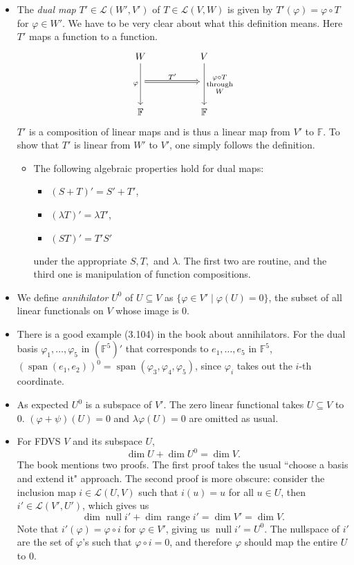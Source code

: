 \documentclass{article}
\newcommand{\F}{\mathbb{F}}
\newcommand{\s}{\operatorname{span}}
\newcommand{\n}{\operatorname{null}}
\renewcommand{\r}{\operatorname{range}}
\renewcommand{\d}{\dim}
\newcommand{\LVW}{\mathcal{L}(V,W)}
\renewcommand{\phi}{\varphi}
\begin{document}
\begin{itemize}
\begin{itemize}
    \end{itemize}
    \item The \textit{dual map} $T' \in \mathcal{L}(W',V')$ of $T \in \LVW$ is given by $T'(\phi)=\phi \circ T$ for $\phi \in W'$. We have to be very clear about what this definition means. Here $T'$ maps a function to a function.
    \begin{equation*}
        \begin{tikzcd}
            W \arrow[dd, "\phi"'] &  & V 
            \arrow[dd, "\substack{\phi \circ T \\ \text{through} \\ W}"] \\
            {} \arrow[rr, "T'", Rightarrow] &  & {} \\
            \F &  & \F
        \end{tikzcd}
    \end{equation*}
    $T'$ is a composition of linear maps and is thus a linear map from $V'$ to $\F$. To show that $T'$ is linear from $W'$ to $V'$, one simply follows the definition.
    \begin{itemize}
        \item The following algebraic properties hold for dual maps:
        \begin{itemize}
            \item $(S+T)'=S'+T'$,
            \item $(\lambda T)'=\lambda T'$,
            \item $(ST)'=T'S'$
        \end{itemize}
        under the appropriate $S,T,$ and $\lambda$. The first two are routine, and the third one is manipulation of function compositions.
    \end{itemize}
    \item We define \textit{annihilator} $U^0$ of $U \subseteq V$ as $\{\phi \in V' \mid \phi(U)=0\}$, the subset of all linear functionals on $V$ whose image is 0.
    \item There is a good example (3.104) in the book about annihilators. For the dual basis $\phi_1,\dots,\phi_5$ in $(\F^5)'$ that corresponds to $e_1,\dots,e_5$ in $\F^5$, $(\s(e_1,e_2))^0 = \s(\phi_3,\phi_4,\phi_5)$, since $\phi_i$ takes out the $i$-th coordinate.
    \item As expected $U^0$ is a subspace of $V'$. The zero linear functional takes $U \subseteq V$ to $0$. $(\phi+\psi)(U) = 0$ and $\lambda\phi(U) = 0$ are omitted as usual.
    \item For FDVS $V$ and its subspace $U$, $$\d U + \d U^0 = \d V.$$ The book mentions two proofs. The first proof takes the usual ``choose a basis and extend it" approach. The second proof is more obscure: consider the inclusion map $i \in \mathcal{L}(U,V)$ such that $i(u) = u$ for all $u \in U$, then $i' \in \mathcal{L}(V',U')$, which gives us $$\d \n i' + \d \r i' = \d V' = \d V.$$ Note that $i'(\phi) = \phi \circ i$ for $\phi \in V'$, giving us $\n i' = U^0$. The nullspace of $i'$ are the set of $\phi$'s such that $\phi \circ i = 0$, and therefore $\phi$ should map the entire $U$ to $0$.
    

\end{itemize}
\end{document}
